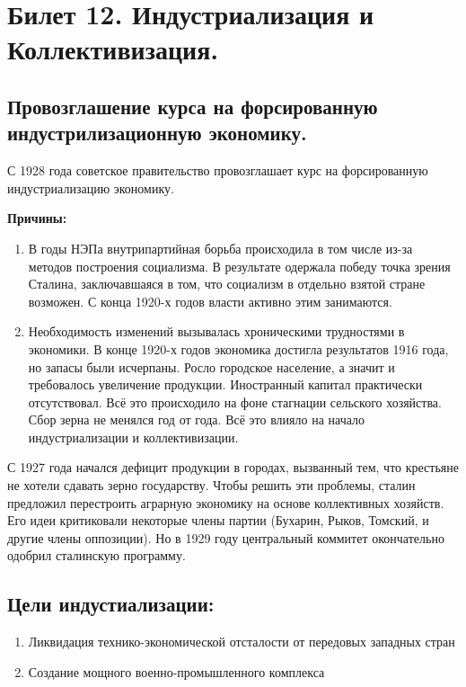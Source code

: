 \section{Билет 12. Индустриализация и Коллективизация.}

\subsection{Провозглашение курса на форсированную индустрилизационную экономику.}

С 1928 года советское правительство провозглашает курс на форсированную индустриализацию экономику. 

\textbf{Причины:}

\begin{enumerate}
    \item В годы НЭПа внутрипартийная борьба происходила в том числе из-за методов построения социализма. В результате одержала победу точка зрения Сталина, заключавшаяся в том, что социализм в отдельно взятой стране возможен. С конца 1920-х годов власти активно этим занимаются.
    \item Необходимость изменений вызывалась хроническими трудностями в экономики. В конце 1920-х годов экономика достигла результатов 1916 года, но запасы были исчерпаны. Росло городское население, а значит и требовалось увеличение продукции. Иностранный капитал практически отсутствовал. Всё это происходило на фоне стагнации сельского хозяйства. Сбор зерна не менялся год от года. Всё это влияло на начало индустриализации и коллективизации.
\end{enumerate}

С 1927 года начался дефицит продукции в городах, вызванный тем, что крестьяне не хотели сдавать зерно государству. Чтобы решить эти проблемы, сталин предложил перестроить аграрную экономику на основе коллективных хозяйств. Его идеи критиковали некоторые члены партии (Бухарин, Рыков, Томский, и другие члены оппозиции). Но в 1929 году центральный коммитет окончательно одобрил сталинскую программу.

\subsection{Цели индустиализации:}

\begin{enumerate}
    \item Ликвидация технико-экономической отсталости от передовых западных стран
    \item Создание мощного военно-промышленного комплекса
\end{enumerate}

